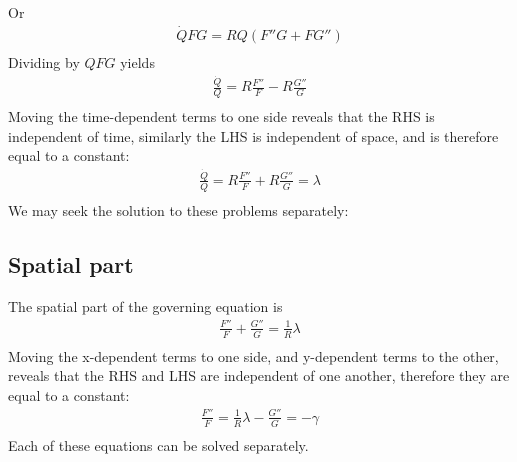 \documentclass[11pt]{article}
\begin{document}
Or
\begin{equation}\begin{aligned}
\dot{Q} FG = R Q( F'' G +  F G'') \\
\end{aligned} \end{equation}
Dividing by $QFG$ yields
\begin{equation}\begin{aligned}
\frac{\dot{Q}}{Q} = R \frac{F''}{F} - R \frac{G''}{G} \\
\end{aligned} \end{equation}
Moving the time-dependent terms to one side reveals that the RHS is independent of time, similarly the LHS is independent of space, and is therefore equal to a constant:
\begin{equation}\begin{aligned}
\frac{\dot{Q}}{Q} = R \frac{F''}{F} + R \frac{G''}{G} = \lambda \\
\end{aligned} \end{equation}
We may seek the solution to these problems separately:

\subsection{Spatial part}
The spatial part of the governing equation is
\begin{equation}\begin{aligned}
 \frac{F''}{F} + \frac{G''}{G} = \frac{1}{R} \lambda \\
\end{aligned} \end{equation}
Moving the x-dependent terms to one side, and y-dependent terms to the other, reveals that the RHS and LHS are independent of one another, therefore they are equal to a constant:
\begin{equation}\begin{aligned}
 \frac{F''}{F} = \frac{1}{R} \lambda - \frac{G''}{G} = - \gamma \\
\end{aligned} \end{equation}
Each of these equations can be solved separately.
\end{document}
